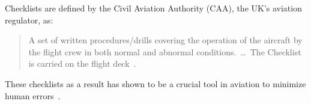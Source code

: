 \documentclass[../dissertation.tex]{subfiles}
\begin{document}



Checklists are defined by the Civil Aviation Authority (CAA),
the UK's aviation regulator, as:
%
\blockquote{A set of written procedures/drills covering
  the operation of the aircraft by the flight
  crew in both normal and abnormal
  conditions.~\ldots~The Checklist is
  carried on the flight deck~\cite{caa:design}.}
These checklists as a result has shown to be a crucial tool in aviation
to minimize human errors~\cite{manifesto}.
\end{document}
